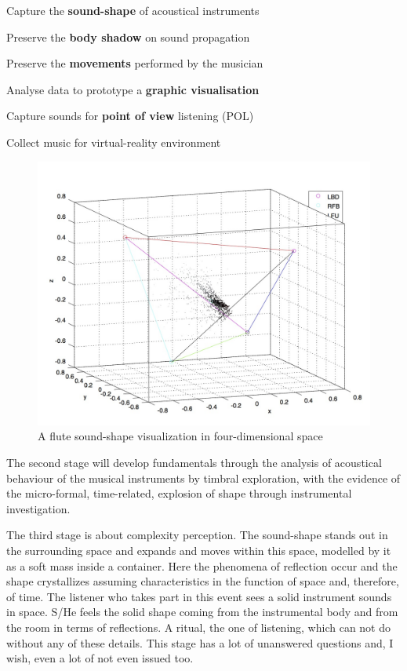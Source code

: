 \documentclass[
	a4paper,
	twocolumn
	]{article}
\begin{document}
\begin{compactitem}
\item Capture the \textbf{sound-shape} of acoustical instruments
\item Preserve the \textbf{body shadow} on sound propagation
\item Preserve the \textbf{movements} performed by the musician
\item Analyse data to prototype a \textbf{graphic visualisation}
\item Capture sounds for \textbf{point of view} listening (POL)
\item Collect music for virtual-reality environment
\end{compactitem}

\vfill\null

\begin{figure}[htbp]
\begin{center}
\includegraphics[width=.47\textwidth]{img/13230_1024_2.jpg}
\caption{A flute sound-shape visualization in four-dimensional space}
\label{shape}
\end{center}
\end{figure}

\newpage

The second stage will develop fundamentals through the analysis of acoustical behaviour of the musical instruments by timbral exploration, with the evidence of the micro-formal, time-related, explosion of shape through instrumental investigation.

The third stage is about complexity perception. The sound-shape stands out in the surrounding space and expands and moves within this space, modelled by it as a soft mass inside a container. Here the phenomena of reflection occur and the shape crystallizes assuming characteristics in the function of space and, therefore, of time. The listener who takes part in this event sees a solid instrument sounds in space. S/He feels the solid shape coming from the instrumental body and from the room in terms of reflections. A ritual, the one of listening, which can not do without any of these details. This stage has a lot of unanswered questions and, I wish, even a lot of not even issued too.
\end{document}
